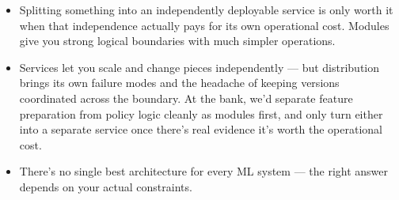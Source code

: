 \documentclass[11pt,a4paper]{article}
\begin{document}
\begin{examplebox}[title after break={SPOKEN SCRIPT --- slide 33 continued}]
\begin{itemize}
\item Splitting something into an independently deployable service is only worth it when that independence actually pays for its own operational cost. Modules give you strong logical boundaries with much simpler operations.
\item Services let you scale and change pieces independently — but distribution brings its own failure modes and the headache of keeping versions coordinated across the boundary. At the bank, we'd separate feature preparation from policy logic cleanly as modules first, and only turn either into a separate service once there's real evidence it's worth the operational cost.
\item There's no single best architecture for every ML system — the right answer depends on your actual constraints.
\end{itemize}
\end{examplebox}
\par\noindent{\scriptsize\textcolor{teal!60!black}{Reading anchor: Kalinowski, Ch. 14 · Nazir et al. (2024)}}
\clearpage
\end{document}
